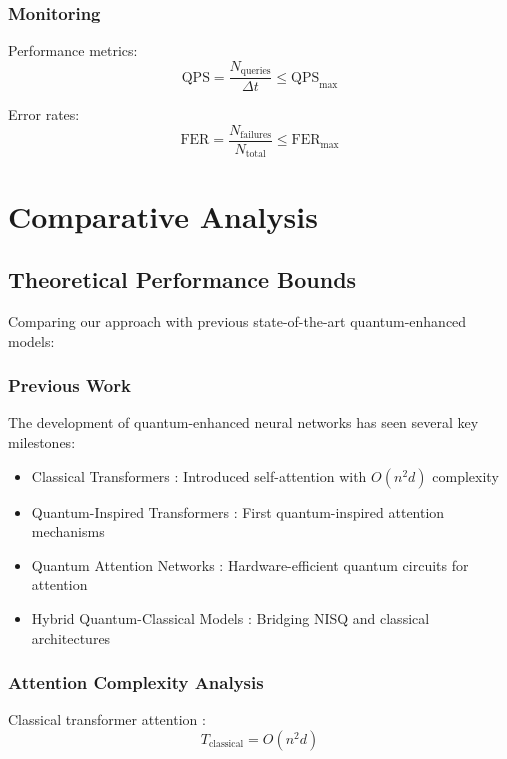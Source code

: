\documentclass{article}
\begin{document}
\subsubsection{Monitoring}
Performance metrics:
\begin{equation}
\text{QPS} = \frac{N_{\text{queries}}}{\Delta t} \leq \text{QPS}_{\text{max}}
\end{equation}

Error rates:
\begin{equation}
\text{FER} = \frac{N_{\text{failures}}}{N_{\text{total}}} \leq \text{FER}_{\text{max}}
\end{equation}

\section{Comparative Analysis}

\subsection{Theoretical Performance Bounds}
Comparing our approach with previous state-of-the-art quantum-enhanced models:

\subsubsection{Previous Work}
The development of quantum-enhanced neural networks has seen several key milestones:

\begin{itemize}
\item Classical Transformers \cite{Vaswani2017attention}: Introduced self-attention with $O(n^2d)$ complexity
\item Quantum-Inspired Transformers \cite{Tang2019quantum}: First quantum-inspired attention mechanisms
\item Quantum Attention Networks \cite{Li2020quantum}: Hardware-efficient quantum circuits for attention
\item Hybrid Quantum-Classical Models \cite{Bharti2022nobsapproach}: Bridging NISQ and classical architectures
\end{itemize}

\subsubsection{Attention Complexity Analysis}
Classical transformer attention \cite{Vaswani2017attention}:
\begin{equation}
T_{\text{classical}} = O(n^2d)
\end{equation}
\end{document}
